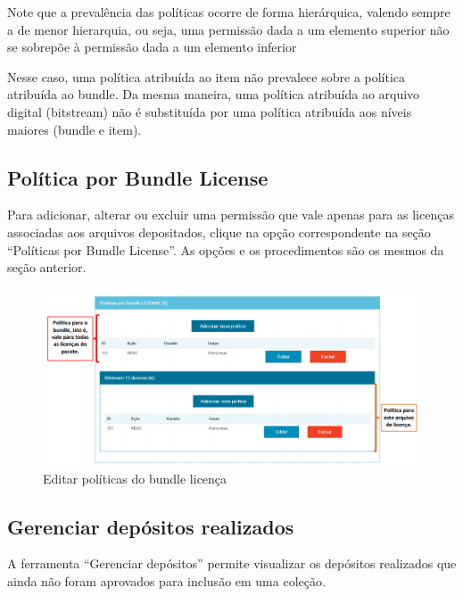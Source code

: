 \documentclass[12pt,hidelinks]{article}
\begin{document}
    Note que a prevalência das políticas ocorre de forma hierárquica, valendo sempre a de menor hierarquia, ou seja, uma permissão dada a um elemento superior não se sobrepõe à permissão dada a um elemento inferior
    
    \singlespacing
    
    Nesse caso, uma política atribuída ao item não prevalece sobre a política atribuída ao bundle. Da  mesma maneira, uma política atribuída ao arquivo digital (bitstream) não é substituída por uma política atribuída aos níveis maiores (bundle e item).

\newpage

    \subsection{Política por Bundle License}
    
    Para adicionar, alterar ou excluir uma permissão que vale apenas para as licenças associadas aos arquivos depositados, clique na opção correspondente na seção “Políticas por Bundle License”. As opções e os procedimentos são os mesmos da seção anterior.
    
    \begin{figure}[!htp]
                \centering
                \includegraphics[scale=0.7]{figura/Figura115.png}
                \caption{Editar políticas do bundle licença}
            \label{Rotulo}
        \end{figure}
    
    \subsection{Gerenciar depósitos realizados}
    
    A ferramenta “Gerenciar depósitos” permite visualizar os depósitos realizados que ainda não foram aprovados para inclusão em uma coleção.
    
\end{document}
